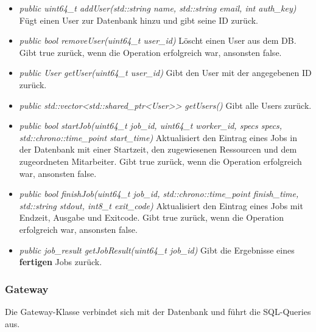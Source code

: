 \documentclass[a4paper,12pt]{article}
\begin{document}
\begin{itemize}[label={}]
\begin{itemize}[label={\textbullet}]
				\item \textit{public uint64\_t addUser(std::string name, std::string email, int auth\_key)} Fügt einen User zur Datenbank hinzu und gibt seine ID zurück. 
				
				\item \textit{public bool removeUser(uint64\_t user\_id)} Löscht einen User aus dem DB. Gibt true zurück, wenn die Operation erfolgreich war, ansonsten false.
				
				\item \textit{public User getUser(uint64\_t user\_id)} Gibt den User mit der angegebenen ID zurück.
				
				\item \textit{public std::vector<std::shared\_ptr<User>> getUsers()} Gibt alle Users zurück.
				
				\item \textit{public bool startJob(uint64\_t job\_id, uint64\_t worker\_id, specs specs, std::chrono::time\_point start\_time)} Aktualisiert den Eintrag eines Jobs in der Datenbank mit einer Startzeit, den zugewiesenen Ressourcen und dem zugeordneten Mitarbeiter. Gibt true zurück, wenn die Operation erfolgreich war, ansonsten false.
				
				\item \textit{public bool finishJob(uint64\_t job\_id, std::chrono::time\_point finish\_time, std::string stdout, int8\_t exit\_code)} Aktualisiert den Eintrag eines Jobs mit Endzeit, Ausgabe und Exitcode. Gibt true zurück, wenn die Operation erfolgreich war, ansonsten false.
				
				\item \textit{public job\_result getJobResult(uint64\_t job\_id)} Gibt die Ergebnisse eines \textbf{fertigen} Jobs zurück.
								
			\end{itemize}
			
	\end{itemize}
\subsubsection{Gateway}

Die Gateway-Klasse verbindet sich mit der Datenbank und führt die SQL-Queries aus.
\end{document}
